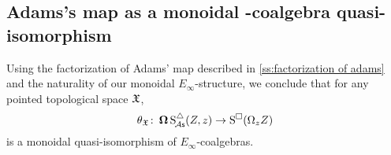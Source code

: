 %


\subsection{Adams's map as a monoidal \pdfEinfty-coalgebra quasi-isomorphism}

Using the factorization of Adams' map described in \cref{ss:factorization of adams} and the naturality of our monoidal $E_\infty$-structure, we conclude that for any pointed topological space $\mathfrak{X}$,
\[
\theta_{\mathfrak{X}} \colon \operatorname{\mathbf{\Omega}} \operatorname{S^{\triangle}_{\!{\mathcal{A}\mathsf{s}}}}(Z,z) \to \operatorname{S^{\square}}(\Omega_z Z)
\]
is a monoidal quasi-isomorphism of $E_{\infty}$-coalgebras.
